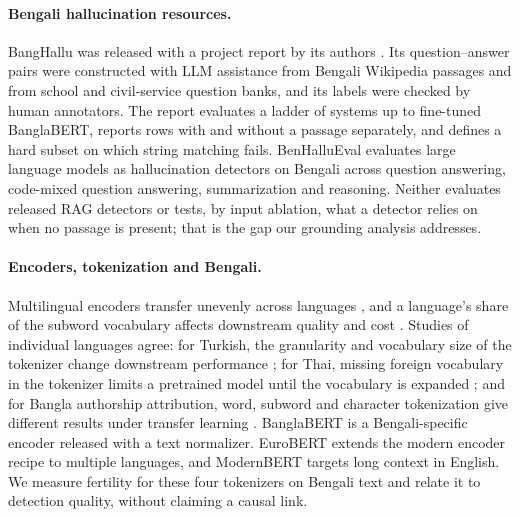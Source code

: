 \documentclass[manuscript,screen,review]{acmart}
\begin{document}
\paragraph{Bengali hallucination resources.}
BangHallu was released with a project report by its authors \cite{banghalluRepo}. Its question--answer pairs were constructed with LLM assistance from Bengali Wikipedia passages and from school and civil-service question banks, and its labels were checked by human annotators. The report evaluates a ladder of systems up to fine-tuned BanglaBERT, reports rows with and without a passage separately, and defines a hard subset on which string matching fails. BenHalluEval \cite{adib2026benhallueval} evaluates large language models as hallucination detectors on Bengali across question answering, code-mixed question answering, summarization and reasoning. Neither evaluates released RAG detectors or tests, by input ablation, what a detector relies on when no passage is present; that is the gap our grounding analysis addresses.

\paragraph{Encoders, tokenization and Bengali.}
Multilingual encoders transfer unevenly across languages \cite{pires2019multilingual,conneau2020xlmr}, and a language's share of the subword vocabulary affects downstream quality \cite{rust2021tokenizer} and cost \cite{petrov2023tokenizer}. Studies of individual languages agree: for Turkish, the granularity and vocabulary size of the tokenizer change downstream performance \cite{toraman2023tokenization}; for Thai, missing foreign vocabulary in the tokenizer limits a pretrained model until the vocabulary is expanded \cite{sriwirote2025phayathaibert}; and for Bangla authorship attribution, word, subword and character tokenization give different results under transfer learning \cite{khatun2022authorship}. BanglaBERT \cite{bhattacharjee2022banglabert} is a Bengali-specific encoder released with a text normalizer. EuroBERT \cite{boizard2025eurobert} extends the modern encoder recipe to multiple languages, and ModernBERT \cite{warner2024modernbert} targets long context in English. We measure fertility for these four tokenizers on Bengali text and relate it to detection quality, without claiming a causal link.
\end{document}
